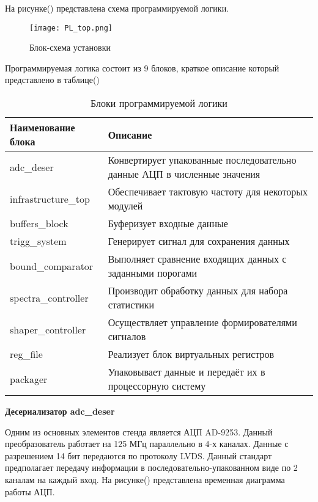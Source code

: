 На рисунке() представлена схема программируемой логики.\par 
\begin{figure}[ht]
    \centering
    \texttt{[image: PL\_top.png]}
    \caption{Блок-схема установки}
    \label{fig:mpr}
\end{figure}
Программируемая логика состоит из 9 блоков, краткое описание который представлено в таблице()\par
\begin{table}[h!]
    \caption{Блоки программируемой логики}
    \begin{tabular}{|p{}|p{}|}
        \hline
        Наименование блока & Описание \\
        \hline
        adc\_deser & Конвертирует упакованные последовательно данные АЦП в численные значения \\
        \hline
        infrastructure\_top & Обеспечивает тактовую частоту для некоторых модулей \\
        \hline
        buffers\_block & Буферизует входные данные \\
        \hline
        trigg\_system & Генерирует сигнал для сохранения данных \\
        \hline
        bound\_comparator & Выполняет сравнение входящих данных с заданными порогами \\
        \hline
        spectra\_controller & Производит обработку данных для набора статистики \\
        \hline
        shaper\_controller & Осуществляет управление формирователями сигналов \\
        \hline
        reg\_file & Реализует блок виртуальных регистров \\
        \hline
        packager & Упаковывает данные и передаёт их в процессорную систему \\
        \hline
    \end{tabular}
\end{table}
\textbf{Десериализатор adc\_deser}\par
Одним из основных элементов стенда является АЦП AD-9253. Данный преобразователь работает на 125 МГц параллельно в 4-х каналах. Данные с разрешением 14 бит передаются по протоколу LVDS. Данный стандарт предполагает передачу информации в последовательно-упакованном виде по 2 каналам на каждый вход. На рисунке() представлена временная диаграмма работы АЦП.\par
